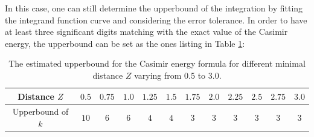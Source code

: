 
In this case, one can still determine the upperbound of the integration by fitting the integrand function curve and considering the error tolerance.
In order to have at least three significant digits matching with the exact value of the Casimir energy, the upperbound can be set as the ones listing in Table \ref{Table: scalar upperbound diff radii}:
\begin{table}[H]
    \centering
    \begin{tabular}{ ||c||c|c|c|c|c|c|c|c|c|c|c| }
        \hline
        Distance $Z$ & $ 0.5$ & $ 0.75$  & $ 1.0$ & $1.25$ & $ 1.5$ & $1.75$  & $2.0$ & $2.25$ & $ 2.5$ & $ 2.75$  & $3.0$ \\\hline
        Upperbound of $k$ & $10$ & $6$ & $6$ & $4$ & $4$ & $3$ & $3$ & $3$ & $3$ & $3$ & $3$ \\\hline
       \end{tabular}
       \bigskip
       \caption{\label{Unqual: distance and upperbound error tolerance} The estimated upperbound for the Casimir energy formula for different minimal distance $Z$ varying from 
       0.5 to 3.0.}
       \label{Table: scalar upperbound diff radii}
\end{table}

